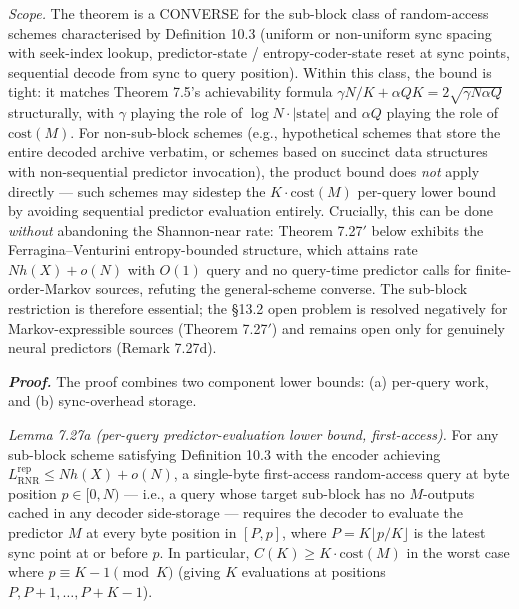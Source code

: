 \documentclass[
]{article}
\begin{document}
\emph{Scope.} The theorem is a CONVERSE for the sub-block class of
random-access schemes characterised by Definition 10.3 (uniform or
non-uniform sync spacing with seek-index lookup, predictor-state /
entropy-coder-state reset at sync points, sequential decode from
sync to query position). Within this class, the bound is tight: it
matches Theorem 7.5's achievability formula $\gamma N / K + \alpha Q
K = 2\sqrt{\gamma N \alpha Q}$ structurally, with $\gamma$ playing
the role of $\log N \cdot |\mathrm{state}|$ and $\alpha Q$ playing
the role of $\mathrm{cost}(M)$. For non-sub-block schemes (e.g.,
hypothetical schemes that store the entire decoded archive
verbatim, or schemes based on succinct data structures with
non-sequential predictor invocation), the product bound does
\emph{not} apply directly --- such schemes may sidestep the
$K \cdot \mathrm{cost}(M)$ per-query lower bound by avoiding
sequential predictor evaluation entirely. Crucially, this can be done
\emph{without} abandoning the Shannon-near rate: Theorem 7.27$'$ below
exhibits the Ferragina--Venturini entropy-bounded structure, which
attains rate $N h(X) + o(N)$ with $O(1)$ query and no query-time
predictor calls for finite-order-Markov sources, refuting the
general-scheme converse. The sub-block restriction is therefore
essential; the §13.2 open problem is resolved negatively for
Markov-expressible sources (Theorem 7.27$'$) and remains open only for
genuinely neural predictors (Remark 7.27d).

\emph{\textbf{Proof.}} The proof combines two component lower bounds:
(a) per-query work, and (b) sync-overhead storage.

\emph{Lemma 7.27a (per-query predictor-evaluation lower bound,
first-access).} For any sub-block scheme satisfying Definition 10.3
with the encoder achieving $L^{\mathrm{rep}}_{\mathrm{RNR}} \leq N h(X)
+ o(N)$, a single-byte first-access random-access query at byte
position $p \in [0, N)$ --- i.e., a query whose target sub-block has
no $M$-outputs cached in any decoder side-storage --- requires the
decoder to evaluate the predictor $M$ at every byte position in
$[P, p]$, where $P = K \lfloor p / K \rfloor$ is the latest sync
point at or before $p$. In particular, $C(K) \geq K \cdot
\mathrm{cost}(M)$ in the worst case where $p \equiv K - 1
\pmod{K}$ (giving $K$ evaluations at positions $P, P+1, \ldots, P+K-1$).
\end{document}
